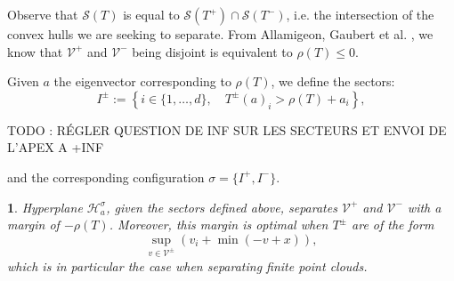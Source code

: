\documentclass[oneside,english,a4paper]{amsart}
\numberwithin{equation}{section}
\numberwithin{figure}{section}
\theoremstyle{plain}
\theoremstyle{definition}
\theoremstyle{plain}
\newtheorem{prop}[thm]{\protect\propositionname}
\theoremstyle{remark}
\theoremstyle{plain}
\theoremstyle{definition}
\theoremstyle{definition}
\providecommand{\propositionname}{Proposition}
\begin{document}
Observe that $\mathcal{S}(T)$ is equal to $\mathcal{S}(T^{+})\cap\mathcal{S}(T^{-})$,
i.e. the intersection of the convex hulls we are seeking to separate.
From Allamigeon, Gaubert et al. \cite{Allamigeon2018}, we know that $\mathcal{V}^{+}$
and $\mathcal{V^{-}}$ being disjoint is equivalent to $\rho(T)\le0$.

Given $a$ the eigenvector corresponding to $\rho(T)$, we define the sectors:
\[
I^{\pm}:=\left\{i\in\{1,\ldots, d\},\quad T^{\pm}(a)_{i}>\rho(T)+a_{i}\right\},
\]

TODO : RÉGLER QUESTION DE INF SUR LES SECTEURS ET ENVOI DE L'APEX A +INF

and the corresponding configuration $\sigma=\{I^{+},I^{-}\}$.
\begin{prop}
Hyperplane $\mathcal{H}_{a}^{\sigma}$, given the sectors defined
above, separates $\mathcal{V}^{+}$ and $\mathcal{V}^{-}$ with a
margin of $-\rho(T)$. Moreover, this margin is optimal when $T^{\pm}$
are of the form
\[
\sup_{v\in\mathcal{V}^{\pm}}\left(v_{i}+\min(-v+x)\right),
\]
which is in particular the case when separating finite point clouds.
\end{prop}
\end{document}
